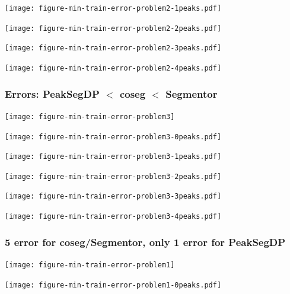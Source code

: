 \documentclass{beamer}
\begin{document}
\begin{frame}
  \texttt{[image: figure-min-train-error-problem2-1peaks.pdf]}
\end{frame}

\begin{frame}
  \texttt{[image: figure-min-train-error-problem2-2peaks.pdf]}
\end{frame}

\begin{frame}
  \texttt{[image: figure-min-train-error-problem2-3peaks.pdf]}
\end{frame}

\begin{frame}
  \texttt{[image: figure-min-train-error-problem2-4peaks.pdf]}
\end{frame}

\begin{frame}
  \frametitle{Errors: PeakSegDP $<$ coseg $<$ Segmentor}
  \texttt{[image: figure-min-train-error-problem3]}
\end{frame}

\begin{frame}
  \texttt{[image: figure-min-train-error-problem3-0peaks.pdf]}
\end{frame}

\begin{frame}
  \texttt{[image: figure-min-train-error-problem3-1peaks.pdf]}
\end{frame}

\begin{frame}
  \texttt{[image: figure-min-train-error-problem3-2peaks.pdf]}
\end{frame}

\begin{frame}
  \texttt{[image: figure-min-train-error-problem3-3peaks.pdf]}
\end{frame}

\begin{frame}
  \texttt{[image: figure-min-train-error-problem3-4peaks.pdf]}
\end{frame}

\begin{frame}
  \frametitle{5 error for coseg/Segmentor, only 1 error for PeakSegDP}
  \texttt{[image: figure-min-train-error-problem1]}
\end{frame}


\begin{frame}
  \texttt{[image: figure-min-train-error-problem1-0peaks.pdf]}
\end{frame}
\end{document}
